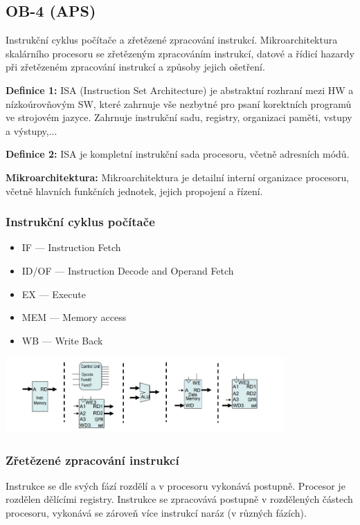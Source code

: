\subsection{OB-4 (APS)}
Instrukční cyklus počítače a zřetězené zpracování instrukcí. Mikroarchitektura skalárního procesoru se zře\-tě\-ze\-ným zpracováním instrukcí, datové a řídicí hazardy při zřetězeném zpracování instrukcí a způsoby jejich ošetření.

\textbf{Definice 1:}
ISA (Instruction Set Architecture) je abstraktní rozhraní mezi HW a nízkoúrovňovým SW, které zahrnuje vše nezbytné pro psaní korektních programů ve strojovém jazyce. Zahrnuje instrukční sadu, registry, organizaci paměti, vstupy a výstupy,...

\textbf{Definice 2:}
ISA je kompletní instrukční sada procesoru, včetně adresních módů.

\textbf{Mikroarchitektura:}
Mikroarchitektura je detailní interní organizace procesoru, včetně hlavních
funkčních jednotek, jejich propojení a řízení.

\subsubsection*{Instrukční cyklus počítače}
\begin{itemize}
	\item IF --- Instruction Fetch
	\item ID/OF --- Instruction Decode and Operand Fetch
	\item EX --- Execute
	\item MEM --- Memory access
	\item WB --- Write Back
\end{itemize}

\includegraphics[width=0.8\textwidth]{img/OB-4_0.jpg}

\subsubsection*{Zřetězené zpracování instrukcí}
Instrukce se dle svých fází rozdělí a v procesoru vykonává postupně. Procesor je rozdělen dělícími registry. Instrukce se zpracovává postupně v rozdělených částech procesoru, vykonává se zároveň více instrukcí naráz (v různých fázích).



